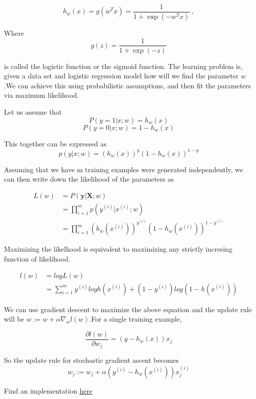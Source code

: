 \documentclass[12pt]{article}
\begin{document}
$$h_{w}(x) = g(w^{T}x) = \frac{1}{1 + \exp{(-w^{T}x)}} \ ,$$

Where $$g(z)= \frac{1}{1+ \exp{(-z)}}$$

is called the logistic function or the sigmoid function.
The learning problem is, given a data set and logistic regression model how will we find the parameter $w$.We can achieve this using probabilistic assumptions, and then fit the parameters via maximum likelihood.

Let us assume that 
$$P(y =1 \vert x;w) = h_{w}(x)$$
$$P(y =0 \vert  x;w) = 1 - h_{w}(x)$$

This together can be expressed as
 $$p(y \vert x;w) = (h_{w}(x))^{y}(1-h_{w}(x))^{1-y}$$
 
 Assuming that we have m training  examples were generated independently, we
 can then write down the likelihood of the parameters as
 
\begin{equation}
 \begin{split}
L(w) & = P(\textbf{y} \vert \textbf{X} ; w) \\
& = \prod_{i=1}^{m} p(y^{(i)} \vert x ^{(i)};w) \\
& = \prod_{i=1}^{m}  (h_{w}(x^{(i)}))^{y^{(i)}}(1-h_{w}(x^{(i)}))^{1-y^{(i)}} 
 \end{split}
\end{equation}


Maximizing the likelhood is equivalent to maximizing any strictly incresing function of likelihood.

\begin{equation}
\begin{split}
l(w) & = log L(w) \\ 
& = \sum_{i =1}^{m} y^{(i)} log h(x^{(i)}) + (1-y^{(i)}) log(1-h(x^{(i)}))
\end{split}
\end{equation}

We can use gradient descent to maximize the above equation and the update rule will be $w := w +\alpha \nabla _{w}l(w)$.For a single training example,




$$\frac{\partial l(w)}{\partial w_{j}} = (y - h_w(x))x_{j}   $$

So the update rule for stochastic gradient ascent becomes $$w_{j} := w_{j} +\alpha (y^{(i)} - h_w(x^{(i)}))x^{(i)}_{j}$$


Find an implementation \href{https://github.com/aswin16/ML-REPORT/blob/master/codes/log_regression.ipynb}{here}
\end{document}
